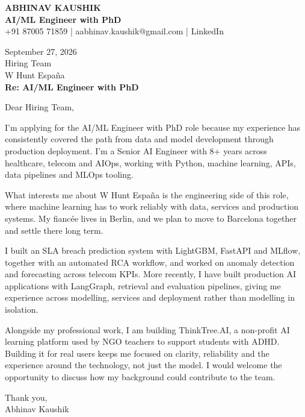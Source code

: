 \documentclass[10pt,a4paper]{article}
\begin{document}
\begin{center}
{\Large\bfseries ABHINAV KAUSHIK}\\[2pt]
{\bfseries AI/ML Engineer with PhD}\\[2pt]
+91 87005 71859 \quad | \quad aabhinav.kaushik@gmail.com \quad | \quad LinkedIn
\end{center}
\vspace{8pt}
September 27, 2026\\[6pt]
Hiring Team\\
W Hunt España\\[4pt]
\textbf{Re: AI/ML Engineer with PhD}

Dear Hiring Team,

I’m applying for the AI/ML Engineer with PhD role because my experience has consistently covered the path from data and model development through production deployment. I’m a Senior AI Engineer with 8+ years across healthcare, telecom and AIOps, working with Python, machine learning, APIs, data pipelines and MLOps tooling.

What interests me about W Hunt España is the engineering side of this role, where machine learning has to work reliably with data, services and production systems. My fiancée lives in Berlin, and we plan to move to Barcelona together and settle there long term.

I built an SLA breach prediction system with LightGBM, FastAPI and MLflow, together with an automated RCA workflow, and worked on anomaly detection and forecasting across telecom KPIs. More recently, I have built production AI applications with LangGraph, retrieval and evaluation pipelines, giving me experience across modelling, services and deployment rather than modelling in isolation.

Alongside my professional work, I am building ThinkTree.AI, a non-profit AI learning platform used by NGO teachers to support students with ADHD. Building it for real users keeps me focused on clarity, reliability and the experience around the technology, not just the model. I would welcome the opportunity to discuss how my background could contribute to the team.

Thank you,\\
Abhinav Kaushik
\end{document}
